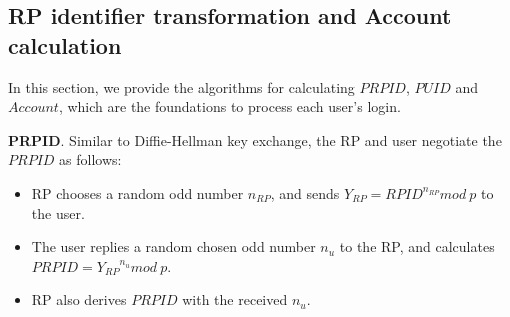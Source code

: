\subsection{RP identifier transformation and Account calculation}
\label{subsec:identifier-generation}
In this section, we provide the algorithms for  calculating  $PRPID$, $PUID$ and $Account$, 
which are the foundations to process each user's login. %

\noindent\textbf{PRPID}. Similar to Diffie-Hellman key exchange\cite{DiffieH76}, the RP and user negotiate the  $PRPID$ as follows:
\begin{itemize}
  \item RP chooses a random odd number $n_{RP}$, and sends $Y_{RP} = {RPID}^{n_{RP}} mod \ p$ to the user.
  \item The user replies a random chosen odd number $n_{u}$ to the RP, and calculates $PRPID = {Y_{RP}}^{n_{u}} mod \ p$.
  \item RP also derives $PRPID$ with the received $n_{u}$.
\end{itemize}

